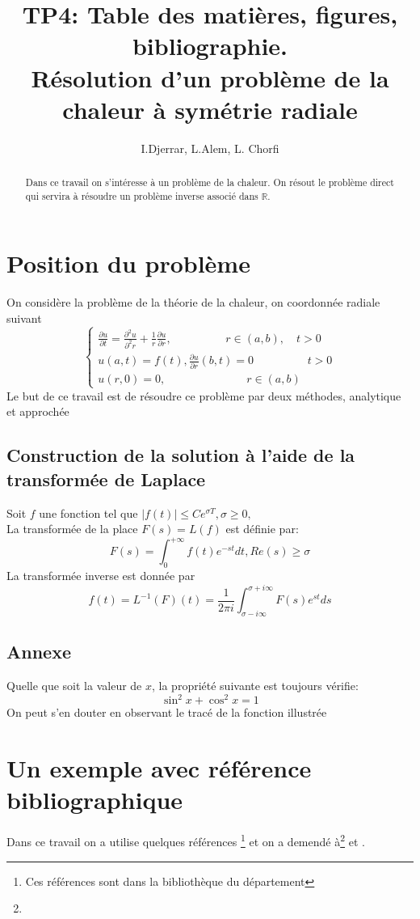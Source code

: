 \documentclass[a4paper,12pt]{article}
\author{I.Djerrar, L.Alem, L. Chorfi}
\date{}
\title{TP4: Table des matières, figures, bibliographie.\\
Résolution d'un problème de la chaleur à symétrie radiale }
\begin{document}
\maketitle %
\begin{abstract}
Dans ce travail on s'intéresse à un problème de la chaleur. On résout le problème direct qui servira à résoudre un problème inverse associé dans $\mathbb{R}.$
\end{abstract}
\tableofcontents
\newpage
\section{Position du problème}
On considère la problème de la théorie de la chaleur, on coordonnée radiale suivant
\begin{equation}
\begin{cases}
\frac{\partial u}{\partial t}=\frac{\partial ^2u}{\partial ^2 r}+\frac{1}{r}\frac{\partial u}{\partial r},\hspace{2cm} r\in\left( a,b\right), \quad t>0\\
u(a,t)=f(t) , \frac{\partial u}{\partial r }(b,t)=0 \hspace{2cm} t>0\\
u(r,0)=0, \hspace{3cm} r\in(a,b)
\end{cases}
\end{equation} 
Le but de ce travail est de résoudre ce problème par deux méthodes, analytique et approchée
\subsection{Construction de la solution à l'aide de la transformée de Laplace }
Soit $f$  une fonction tel que $|{f(t)}| \leq Ce^{\sigma T}, \sigma\geq 0,$\\
La transformée de la place $F(s)=L(f)$ est définie par:
$$F(s) = \int_{0}^{+\infty}f(t)e^{-st}dt,  Re(s)\geq \sigma $$
La transformée inverse est donnée par\cite{Ditkine}
$$f(t)= L^{-1}(F)(t)=\frac{1}{2\pi i}\int_{\sigma-i\infty}^{\sigma+i\infty}F(s)e^{st}ds$$
\subsection{Annexe}
Quelle que soit la valeur de $x$, la propriété suivante est toujours vérifie:
$$\sin^2x+\cos^2x=1$$
On peut s'en douter en observant le tracé de la fonction illustrée
\section{Un exemple avec référence bibliographique }
Dans ce travail on a utilise quelques références \footnote{Ces références sont dans la bibliothèque du département} et on a demendé à\footnote{}\cite{Ditkine} et \cite{Herbin}.
\end{document}

